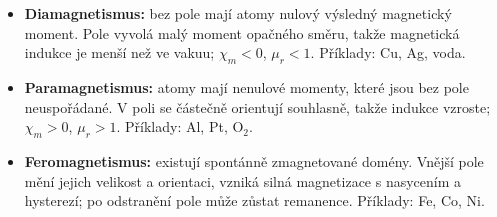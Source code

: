 \begin{itemize}
\item \textbf{Diamagnetismus:} bez pole mají atomy nulový výsledný magnetický moment. Pole vyvolá malý moment opačného směru, takže magnetická indukce je menší než ve vakuu; $\chi_m<0$, $\mu_r<1$. Příklady: Cu, Ag, voda.
\item \textbf{Paramagnetismus:} atomy mají nenulové momenty, které jsou bez pole neuspořádané. V poli se částečně orientují souhlasně, takže indukce vzroste; $\chi_m>0$, $\mu_r>1$. Příklady: Al, Pt, O$_2$.
\item \textbf{Feromagnetismus:} existují spontánně zmagnetované domény. Vnější pole mění jejich velikost a orientaci, vzniká silná magnetizace s nasycením a hysterezí; po odstranění pole může zůstat remanence. Příklady: Fe, Co, Ni.
\end{itemize}
